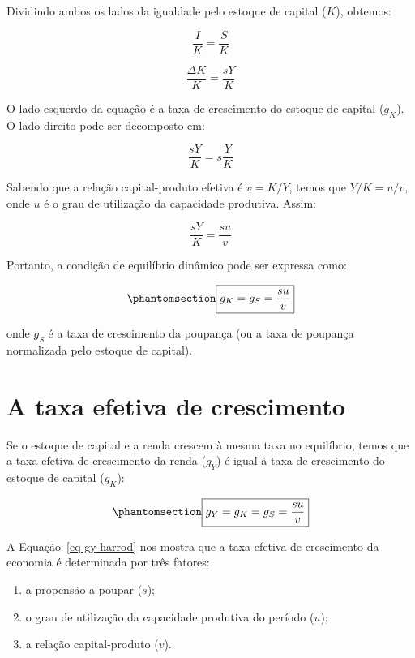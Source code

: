 \documentclass[
  brazilian,
  letterpaper,
  DIV=11,
  numbers=noendperiod]{scrreprt}
\providecommand{\tightlist}{%
  \setlength{\itemsep}{0pt}\setlength{\parskip}{0pt}}
\begin{document}
Dividindo ambos os lados da igualdade pelo estoque de capital (\(K\)),
obtemos:

\[\frac{I}{K} = \frac{S}{K}\]

\[\frac{\Delta K}{K} = \frac{sY}{K}\]

O lado esquerdo da equação é a taxa de crescimento do estoque de capital
(\(g_K\)). O lado direito pode ser decomposto em:

\[\frac{sY}{K} = s \frac{Y}{K}\]

Sabendo que a relação capital-produto efetiva é \(v = K/Y\), temos que
\(Y/K = u/v\), onde \(u\) é o grau de utilização da capacidade
produtiva. Assim:

\[\frac{sY}{K} = \frac{s u}{v}\]

Portanto, a condição de equilíbrio dinâmico pode ser expressa como:

\begin{equation}\protect\phantomsection\label{eq-gs-harrod}{\boxed{g_K = g_S = \frac{s u}{v}}}\end{equation}

onde \(g_S\) é a taxa de crescimento da poupança (ou a taxa de poupança
normalizada pelo estoque de capital).

\section{A taxa efetiva de crescimento}\label{sec-efetiva-harrod}

Se o estoque de capital e a renda crescem à mesma taxa no equilíbrio,
temos que a taxa efetiva de crescimento da renda (\(g_Y\)) é igual à
taxa de crescimento do estoque de capital (\(g_K\)):

\begin{equation}\protect\phantomsection\label{eq-gy-harrod}{\boxed{g_Y = g_K = g_S = \frac{s u}{v}}}\end{equation}

A Equação~\ref{eq-gy-harrod} nos mostra que a taxa efetiva de
crescimento da economia é determinada por três fatores:

\begin{enumerate}
\def\labelenumi{\arabic{enumi}.}
\tightlist
\item
  a propensão a poupar (\(s\));
\item
  o grau de utilização da capacidade produtiva do período (\(u\));
\item
  a relação capital-produto (\(v\)).
\end{enumerate}
\end{document}
